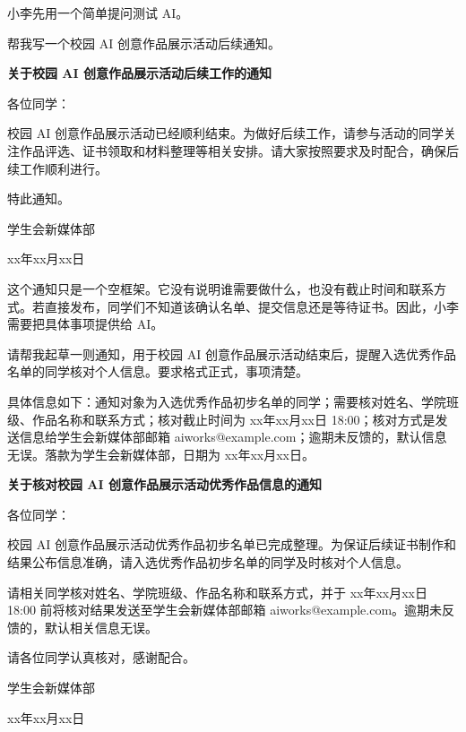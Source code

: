 小李先用一个简单提问测试 AI。

\begin{userbox}
帮我写一个校园 AI 创意作品展示活动后续通知。
\end{userbox}

\begin{aibox}

\begin{center}
\textbf{关于校园 AI 创意作品展示活动后续工作的通知}
\end{center}


\noindent 各位同学：

\par\qquad 校园 AI 创意作品展示活动已经顺利结束。为做好后续工作，请参与活动的同学关注作品评选、证书领取和材料整理等相关安排。请大家按照要求及时配合，确保后续工作顺利进行。

\par\qquad 特此通知。

\par\hfill 学生会新媒体部

\par\hfill xx年xx月xx日
\end{aibox}

这个通知只是一个空框架。它没有说明谁需要做什么，也没有截止时间和联系方式。若直接发布，同学们不知道该确认名单、提交信息还是等待证书。因此，小李需要把具体事项提供给 AI。

\begin{userbox}
请帮我起草一则通知，用于校园 AI 创意作品展示活动结束后，提醒入选优秀作品名单的同学核对个人信息。要求格式正式，事项清楚。

具体信息如下：通知对象为入选优秀作品初步名单的同学；需要核对姓名、学院班级、作品名称和联系方式；核对截止时间为 xx年xx月xx日 18:00；核对方式是发送信息给学生会新媒体部邮箱 aiworks@example.com；逾期未反馈的，默认信息无误。落款为学生会新媒体部，日期为 xx年xx月xx日。
\end{userbox}

\begin{aibox}
\begin{center}
\textbf{关于核对校园 AI 创意作品展示活动优秀作品信息的通知}
\end{center}

\noindent 各位同学：

\par\qquad 校园 AI 创意作品展示活动优秀作品初步名单已完成整理。为保证后续证书制作和结果公布信息准确，请入选优秀作品初步名单的同学及时核对个人信息。

\par\qquad 请相关同学核对姓名、学院班级、作品名称和联系方式，并于 xx年xx月xx日 18:00 前将核对结果发送至学生会新媒体部邮箱 aiworks@example.com。逾期未反馈的，默认相关信息无误。

\par\qquad 请各位同学认真核对，感谢配合。

\par\hfill 学生会新媒体部

\par\hfill xx年xx月xx日
\end{aibox}

